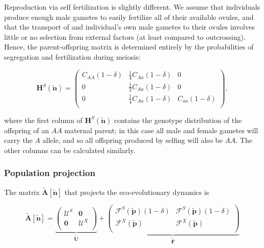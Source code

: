 \documentclass[11pt]{article}
\def\mbf#1{\mathbf{#1}}
\def\mcal#1{\mathcal{#1}}
\begin{document}
Reproduction via self fertilization is slightly different. We assume that individuals produce enough male gametes to easily fertilize all of their available ovules, and that the transport of and individual's own male gametes to their ovules involves little or no selection from external factors (at least compared to outcrossing). Hence, the parent-offspring matrix is determined entirely by the probabilities of segregation and fertilization during meiosis: 

\begin{equation} \label{eq:HS}
	\mbf{H}^S(\tilde{\mbf{n}}) = 
			\left(
			\begin{array}{ccc}
				C_{AA}(1 - \delta) & \frac{1}{4} C_{Aa}(1 - \delta) & 0 \\
				0      & \frac{1}{2} C_{Aa}(1 - \delta) & 0 \\
				0 & \frac{1}{4} C_{Aa}(1 - \delta) & C_{aa}(1 - \delta) \\
			\end{array} \right),
\end{equation}

\noindent where the first column of $\mbf{H}^S(\tilde{\mbf{n}})$ contains the genotype distribution of the offspring of an $AA$ maternal parent; in this case all male and female gametes will carry the $A$ allele, and so all offspring produced by selfing will also be $AA$. The other columns can be calculated similarly.


\subsubsection*{Population projection}

The matrix $\tilde{\mbf{A}}[\tilde{\mbf{n}}]$ that projects the eco-evolutionary dynamics is

\begin{equation}
	\tilde{\mbf{A}}[\tilde{\mbf{n}}] = 
			\underbrace{\left(
			\begin{array}{c|c}
				\mcal{U}^S & \mbf{0} \\ \hline
				\mbf{0} & \mcal{U}^X \\
			\end{array} \right)}_{\tilde{\mbf{U}}} + 
			\underbrace{\left(
			\begin{array}{c|c}
				\mcal{F}^S(\tilde{\mbf{p}}) (1 - \delta) & \mcal{F}^S(\tilde{\mbf{p}}) (1 - \delta) \\ \hline
				\mcal{F}^X(\tilde{\mbf{p}}) & \mcal{F}^X(\tilde{\mbf{p}}) \\
			\end{array} \right)}_{\tilde{\mbf{F}}}
\end{equation}
\end{document}
